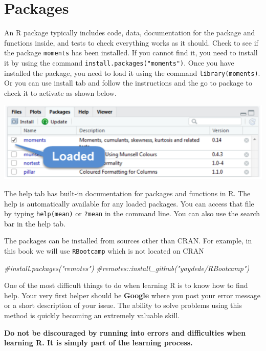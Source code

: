 \documentclass[
]{book}
\newenvironment{Shaded}{\begin{snugshade}}{\end{snugshade}}
\newcommand{\CommentTok}[1]{\textcolor[rgb]{0.56,0.35,0.01}{\textit{#1}}}
\theoremstyle{definition}
\theoremstyle{definition}
\theoremstyle{definition}
\theoremstyle{definition}
\theoremstyle{remark}
\begin{document}
\hypertarget{packages}{%
\section{Packages}\label{packages}}

An R package typically includes code, data, documentation for the package and functions inside, and tests to check everything works as it should. Check to see if the package \texttt{moments} has been installed. If you cannot find it, you need to install it by using the command \texttt{install.packages("moments")}. Once you have installed the package, you need to load it using the command \texttt{library(moments)}. Or you can use install tab and follow the instructions and the go to package to check it to activate as shown below.

\includegraphics[width=8.12in]{png/Rstudio4}

The help tab has built-in documentation for packages and functions in R. The help is automatically available for any loaded packages. You can access that file by typing \texttt{help(mean)} or \texttt{?mean} in the command line. You can also use the search bar in the help tab.

The packages can be installed from sources other than CRAN. For example, in this book we will use \texttt{RBootcamp} which is not located on CRAN

\begin{Shaded}
\begin{Highlighting}[]
\CommentTok{\#install.packages("remotes")}
\CommentTok{\#remotes::install\_github("yaydede/RBootcamp")}
\end{Highlighting}
\end{Shaded}

One of the most difficult things to do when learning R is to know how to find help. Your very first helper should be \textbf{Google} where you post your error message or a short description of your issue. The ability to solve problems using this method is quickly becoming an extremely valuable skill.

\textbf{Do not be discouraged by running into errors and difficulties when learning R. It is simply part of the learning process.}
\end{document}
